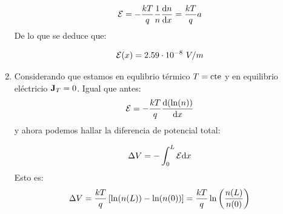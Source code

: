 \begin{texercise}
\begin{enumerate}[label=\alph*)]
		\begin{equation}
			\mathcal{E} = - \frac{kT}{q} \frac{1}{n} \frac{\mathrm{d} n}{\mathrm{d} x} = \frac{kT}{q} a
		\end{equation}
		De lo que se deduce que:

		\begin{equation}
			\Ecal(x) = 2.59 \cdot 10^{-8} \ V/m
		\end{equation}
		\item Considerando que estamos en equlibrio térmico $T=\text{cte}$ y en equilibrio eléctricio $\mathbf{J}_T=0$. Igual que antes:
		\begin{equation}
			\mathcal{E} = - \frac{kT}{q} \frac{\mathrm{d} (\ln(n))}{\mathrm{d} x}
		\end{equation}
		y ahora podemos hallar la diferencia de potencial total:

		\begin{equation}
			\Delta V = - \int_{0}^L \mathcal{E} \mathrm{d} x
		\end{equation}
		Esto es:
		\begin{equation}
			\Delta V = \frac{kT}{q} \left[ \ln(n(L))-\ln(n(0)) \right] = \frac{kT}{q} \ln\left( \frac{n(L)}{n(0)} \right) 
		\end{equation}
	\end{enumerate}
\end{texercise}



